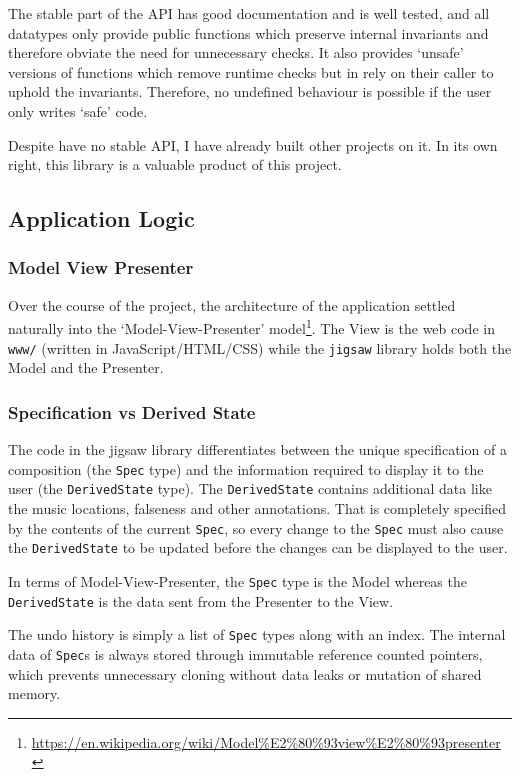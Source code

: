 \documentclass[12pt]{article}
\newcommand{\footurl}[1]{\footnote{\url{#1}}}
\begin{document}
The stable part of the API has good documentation and is well tested, and all datatypes only provide
public functions which preserve internal invariants and therefore obviate the need for unnecessary
checks.  It also provides `unsafe' versions of functions which remove runtime checks but in rely on
their caller to uphold the invariants.  Therefore, no undefined behaviour is possible if the user
only writes `safe' code.

Despite have no stable API, I have already built other projects on it.  In its own right, this
library is a valuable product of this project.

\subsection{Application Logic}

\subsubsection{Model View Presenter}

Over the course of the project, the architecture of the application settled naturally into the
`Model-View-Presenter'
model\footurl{https://en.wikipedia.org/wiki/Model\%E2\%80\%93view\%E2\%80\%93presenter}.  The View
is the web code in \verb|www/| (written in JavaScript/HTML/CSS) while the \verb|jigsaw| library
holds both the Model and the Presenter.

\subsubsection{Specification vs Derived State}

The code in the jigsaw library differentiates between the unique specification of a composition
(the \verb|Spec| type) and the information required to display it to the user (the
\verb|DerivedState| type).  The \verb|DerivedState| contains additional data like the music
locations, falseness and other annotations.  That is completely specified by the contents of the
current \verb|Spec|, so every change to the \verb|Spec| must also cause the \verb|DerivedState| to
be updated before the changes can be displayed to the user.

In terms of Model-View-Presenter, the \verb|Spec| type is the Model whereas the \verb|DerivedState|
is the data sent from the Presenter to the View.

The undo history is simply a list of \verb|Spec| types along with an index.  The internal data of
\verb|Spec|s is always stored through immutable reference counted pointers, which prevents
unnecessary cloning without data leaks or mutation of shared memory.
\end{document}
